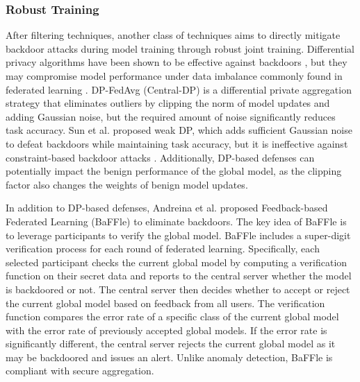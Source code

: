 \documentclass[conference]{IEEEtran}
\begin{document}
\subsubsection{Robust Training}
After filtering techniques, another class of techniques aims to directly mitigate backdoor attacks during model training through robust joint training.
Differential privacy algorithms have been shown to be effective against backdoors \cite{b82}, but they may compromise model performance under data imbalance
commonly found in federated learning \cite{b83}. DP-FedAvg \cite{b84} (Central-DP) is a differential private aggregation strategy that eliminates
outliers by clipping the norm of model updates and adding Gaussian noise, but the required amount of noise significantly reduces
task accuracy. Sun et al. \cite{b27} proposed weak DP, which adds sufficient Gaussian noise to defeat backdoors while maintaining task accuracy,
but it is ineffective against constraint-based backdoor attacks \cite{b25}.
Additionally, DP-based defenses can potentially impact the benign performance of the global model,
as the clipping factor also changes the weights of benign model updates.

In addition to DP-based defenses, Andreina et al. \cite{b85}proposed Feedback-based Federated Learning (BaFFle) to eliminate backdoors.
The key idea of BaFFle is to leverage participants to verify the global model. BaFFle includes a super-digit verification process for each
round of federated learning. Specifically, each selected participant checks the current global model by computing a verification function on
their secret data and reports to the central server whether the model is backdoored or not. The central server then decides whether
to accept or reject the current global model based on feedback from all users. The verification function compares the error rate of
a specific class of the current global model with the error rate of previously accepted global models. If the error rate is significantly different,
the central server rejects the current global model as it may be backdoored and issues an alert. Unlike anomaly detection, BaFFle is compliant with secure aggregation.
\end{document}
